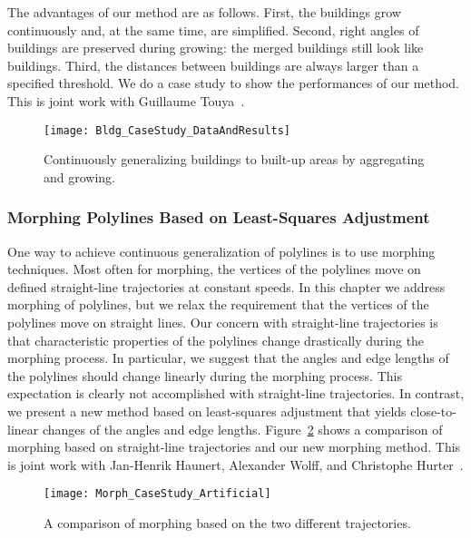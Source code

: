 The advantages of our method are as follows. 
First, the buildings grow continuously 
and, at the same time, are simplified.
Second, right angles of buildings are preserved during growing: 
the merged buildings still look like buildings. 
Third, the distances between buildings are 
always larger than a specified threshold.
We do a case study to show the performances of our method.
This is joint work with Guillaume Touya~\cite{Peng2017Building}.

\begin{figure}[tb]
	\centering
	\texttt{[image: Bldg\_CaseStudy\_DataAndResults]}
	\caption{Continuously generalizing buildings to built-up 
		areas by aggregating and growing.}
	\label{fig:Intro_BldgGrow}
\end{figure}

\subsubsection{Morphing Polylines 
	Based on Least-Squares Adjustment}

One way to achieve continuous generalization of polylines is to 
use morphing 
techniques. 
Most often for morphing, the vertices of the polylines move on 
defined 
straight-line trajectories at constant speeds.
In this chapter we address morphing of polylines, but we relax 
the requirement 
that the vertices of the polylines move on straight lines. Our 
concern with 
straight-line trajectories is that characteristic properties of 
the polylines 
change drastically during the morphing process. In particular, 
we suggest that 
the angles and edge lengths of the polylines should change 
linearly during the 
morphing process. This expectation is clearly not accomplished 
with 
straight-line trajectories. In contrast, we present a new method 
based on 
least-squares adjustment that yields close-to-linear changes of 
the angles and 
edge lengths. 
Figure~\ref{fig:Intro_LSA_Compare} shows a comparison of 
morphing based on 
straight-line trajectories and our new morphing method.
This is joint work with Jan-Henrik Haunert,
Alexander Wolff, and Christophe Hurter~\cite{Peng2013LSA}.

\begin{figure}[htb]
	\centering
	\texttt{[image: Morph\_CaseStudy\_Artificial]}
	\caption{A comparison of morphing based on the two different 
	trajectories.}
	\label{fig:Intro_LSA_Compare}
\end{figure}

